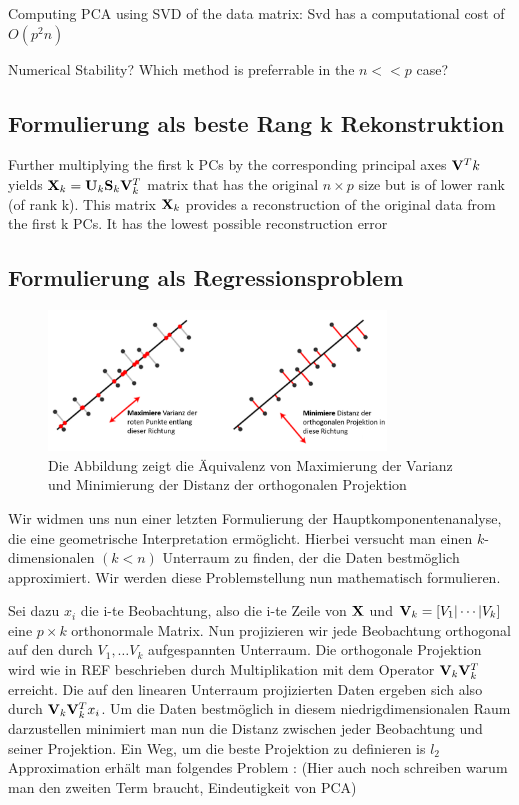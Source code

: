 Computing PCA using SVD of the data matrix:
Svd has a computational cost of $O(p^2n)$

Numerical Stability? Which method is preferrable in the $n << p$ case?


\subsection{Formulierung als beste Rang k Rekonstruktion}
Further multiplying the first k PCs by the corresponding principal axes $\mathbf{V}^T k$ yields $\mathbf{X}_k = \mathbf{U}_k \mathbf{S}_k \mathbf{V}_k^T$ matrix that has the original $n \times p$ size but is of lower rank (of rank k). This matrix $\mathbf{X}_k$ provides a reconstruction of the original data from the first k PCs. It has the lowest possible reconstruction error


\subsection{Formulierung als Regressionsproblem}

\begin{figure}
\centering
\includegraphics[width = 0.8\textwidth]{figures/pca_projection_explanation_german.png}
\caption{Die Abbildung zeigt die Äquivalenz von Maximierung der Varianz und Minimierung der Distanz der orthogonalen Projektion}
\label{pca_projection_explanation}
\end{figure}

Wir widmen uns nun einer letzten Formulierung der Hauptkomponentenanalyse, die eine geometrische Interpretation ermöglicht. Hierbei versucht man einen $k$-dimensionalen $(k < n)$ Unterraum zu finden, der die Daten bestmöglich approximiert. Wir werden diese Problemstellung nun mathematisch formulieren.

Sei dazu $x_i$ die i-te Beobachtung, also die i-te Zeile von $\mathbf{X}$ und $\mathbf{V}_k = [V_1 \vert \cdots \vert V_k]$ eine $p \times k$ orthonormale Matrix. Nun projizieren wir jede Beobachtung orthogonal auf den durch $V_1, \ldots V_k$ aufgespannten Unterraum. Die orthogonale Projektion wird wie in REF beschrieben durch Multiplikation mit dem Operator $\mathbf{V}_k \mathbf{V}_k^T$ erreicht. Die auf den linearen Unterraum projizierten Daten ergeben sich also durch $\mathbf{V}_k \mathbf{V}_k^T x_i$. Um die Daten bestmöglich in diesem niedrigdimensionalen Raum darzustellen minimiert man nun die Distanz zwischen jeder Beobachtung und seiner Projektion. Ein Weg, um die beste Projektion zu definieren is $l_2$ Approximation erhält man folgendes Problem \cite{zou_sparsepca}: (Hier auch noch schreiben warum man den zweiten Term braucht, Eindeutigkeit von PCA)

